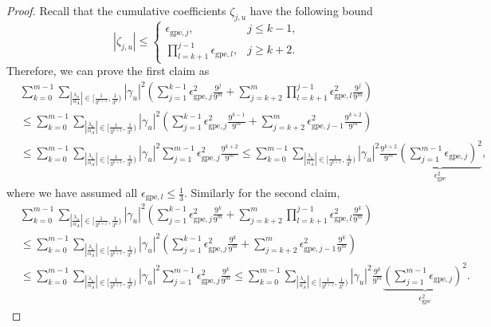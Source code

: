 \documentclass[10pt,a4paper]{amsart}
\newcommand{\abs}[1]{\left\lvert#1\right\rvert}
\begin{document}
\begin{proof}
Recall that the cumulative coefficients $\zeta_{j,u}$ have the following bound
\begin{equation}
    \abs{\zeta_{j,u}}\leq
    \begin{cases}
        \epsilon_{\text{gpe},j},\qquad&j\leq k-1,\\
        \prod\limits_{l=k+1}^{j-1}\epsilon_{\text{gpe},l},&j\geq k+2.
    \end{cases}
\end{equation}
Therefore, we can prove the first claim as
\begin{equation}
\begin{aligned}
    &\sum_{k=0}^{m-1}\sum_{\abs{\frac{\lambda_u}{\alpha_A}}\in\big[\frac{1}{3^{k+1}},\frac{1}{3^k}\big)}
    \abs{\gamma_u}^2
    \left(\sum_{j=1}^{k-1}\epsilon_{\text{gpe},j}^2\frac{9^{j}}{9^m}
    +\sum_{j=k+2}^{m}\prod_{l=k+1}^{j-1}\epsilon_{\text{gpe},l}^2\frac{9^{j}}{9^m}\right)\\
    &\leq\sum_{k=0}^{m-1}\sum_{\abs{\frac{\lambda_u}{\alpha_A}}\in\big[\frac{1}{3^{k+1}},\frac{1}{3^k}\big)}
    \abs{\gamma_u}^2
    \left(\sum_{j=1}^{k-1}\epsilon_{\text{gpe},j}^2\frac{9^{k-1}}{9^m}
    +\sum_{j=k+2}^{m}\epsilon_{\text{gpe},j-1}^2\frac{9^{k+2}}{9^m}\right)\\
    &\leq\sum_{k=0}^{m-1}\sum_{\abs{\frac{\lambda_u}{\alpha_A}}\in\big[\frac{1}{3^{k+1}},\frac{1}{3^k}\big)}
    \abs{\gamma_u}^2
    \sum_{j=1}^{m-1}\epsilon_{\text{gpe},j}^2
    \frac{9^{k+2}}{9^m}
    \leq\sum_{k=0}^{m-1}\sum_{\abs{\frac{\lambda_u}{\alpha_A}}\in\big[\frac{1}{3^{k+1}},\frac{1}{3^k}\big)}
    \abs{\gamma_u}^2
    \frac{9^{k+2}}{9^m}
    \underbrace{\left(\sum_{j=1}^{m-1}\epsilon_{\text{gpe},j}\right)^2}_{\epsilon_{\text{gpe}}^2},
\end{aligned}
\end{equation}
where we have assumed all $\epsilon_{\text{gpe},l}\leq\frac{1}{3}$.
Similarly for the second claim,
\begin{equation}
\begin{aligned}
    &\sum_{k=0}^{m-1}\sum_{\abs{\frac{\lambda_u}{\alpha_A}}\in\big[\frac{1}{3^{k+1}},\frac{1}{3^k}\big)}
    \abs{\gamma_u}^2
    \left(\sum_{j=1}^{k-1}\epsilon_{\text{gpe},j}^2\frac{9^{k}}{9^m}
    +\sum_{j=k+2}^{m}\prod_{l=k+1}^{j-1}\epsilon_{\text{gpe},l}^2\frac{9^{k}}{9^m}\right)\\
    &\leq\sum_{k=0}^{m-1}\sum_{\abs{\frac{\lambda_u}{\alpha_A}}\in\big[\frac{1}{3^{k+1}},\frac{1}{3^k}\big)}
    \abs{\gamma_u}^2
    \left(\sum_{j=1}^{k-1}\epsilon_{\text{gpe},j}^2\frac{9^{k}}{9^m}
    +\sum_{j=k+2}^{m}\epsilon_{\text{gpe},j-1}^2\frac{9^{k}}{9^m}\right)\\
    &\leq\sum_{k=0}^{m-1}\sum_{\abs{\frac{\lambda_u}{\alpha_A}}\in\big[\frac{1}{3^{k+1}},\frac{1}{3^k}\big)}
    \abs{\gamma_u}^2
    \sum_{j=1}^{m-1}\epsilon_{\text{gpe},j}^2
    \frac{9^{k}}{9^m}
    \leq\sum_{k=0}^{m-1}\sum_{\abs{\frac{\lambda_u}{\alpha_A}}\in\big[\frac{1}{3^{k+1}},\frac{1}{3^k}\big)}
    \abs{\gamma_u}^2
    \frac{9^{k}}{9^m}
    \underbrace{\left(\sum_{j=1}^{m-1}\epsilon_{\text{gpe},j}\right)^2}_{\epsilon_{\text{gpe}}^2}.
\end{aligned}
\end{equation}
\end{proof}
\end{document}
